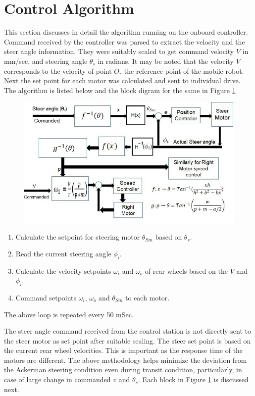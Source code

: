 \section{Control Algorithm }
This section discusses in detail the algorithm running on the onboard controller.  Command received by the controller was parsed to extract the velocity  and the steer angle  information. They were suitably scaled to get command velocity  $V$ in mm/sec, and steering  angle $\theta_s$ in radians.  It may be noted that the velocity $V$ corresponds to the velocity of point $O_r$ the reference point of the mobile robot.  Next the set point for each motor was calculated  and sent to individual drive. The algorithm is listed below and the block digram for the same in Figure \ref{fig:ControlBlock}
\begin{figure}[h]
	\includegraphics[width=\linewidth,keepaspectratio]{Chapter5/fig/BlkDigLocal2}
	\label{fig:ControlBlock} 
\end{figure}

\begin{enumerate}
	\item Calculate the setpoint for steering motor $\theta_{Sm} $ based on $\theta_s$.
	\item Read the current steering  angle $\phi_{i}$.
	\item Calculate the velocity setpoints $\omega_{i}$ and $\omega_{o}$ of  rear wheels based on the $V$ and $\phi_{i}$.

	
	\item Command  setpoints $\omega_{i}$, $\omega_{o}$ and $\theta_{Sm} $ to each motor. 
\end{enumerate}
The above loop is repeated every 50 mSec.

The steer angle command received from the control station is not directly sent to the steer motor as set point after suitable scaling. The steer set point is based on the current rear wheel velocities. This is important as the response time of the  motors are different. The above methodology helps  minimize the deviation  from the Ackerman  steering condition even during transit condition, particularly, in case of large change in commanded $v$ and $\theta_s$. 
Each block in Figure \ref{fig:ControlBlock} is discussed next. 

